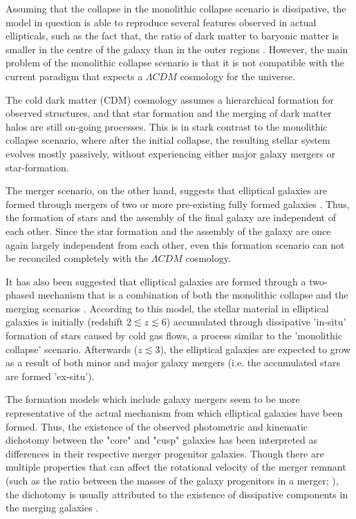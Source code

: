 \documentclass[english, twoside]{HYgradu}
\begin{document}
Assuming that the collapse in the monolithic collapse scenario is dissipative, the model in question is able to reproduce several features observed in actual ellipticals, such as the fact that, the ratio of dark matter to baryonic matter is smaller in the centre of the galaxy than in the outer regions \citep{GalaxyFormationAndEvo2010}. However, the main problem of the monolithic collapse scenario is that it is not compatible with the current paradigm that expects a $\Lambda CDM$ cosmology for the universe. 

The cold dark matter (CDM) cosmology assumes a hierarchical formation for observed structures, and that star formation and the merging of dark matter halos are still on-going processes. This is in stark contrast to the monolithic collapse scenario, where after the initial collapse, the resulting stellar system evolves mostly passively, without experiencing either major galaxy mergers or star-formation.

The merger scenario, on the other hand, suggests that elliptical galaxies are formed through mergers of two or more pre-existing fully formed galaxies \citep{GalaxyFormationAndEvo2010}. Thus, the formation of stars and the assembly of the final galaxy are independent of each other. Since the star formation and the assembly of the galaxy are once again largely independent from each other, even this formation scenario can not be reconciled completely with the $\Lambda CDM$ cosmology.

It has also been suggested that elliptical galaxies are formed through a two-phased mechanism that is a combination of both the monolithic collapse and the merging scenarios \citep[e.g.][]{Oser2010}. According to this model, the stellar material in elliptical galaxies is initially (redshift $2 \lesssim z \lesssim 6$) accumulated through dissipative 'in-situ' formation of stars caused by cold gas flows, a process similar to the 'monolithic collapse' scenario. Afterwards ($z \lesssim 3$), the elliptical galaxies are expected to grow as a result of both minor and major galaxy mergers (i.e. the accumulated stars are formed 'ex-situ'). 

The formation models which include galaxy mergers seem to be more representative of the actual mechanism from which elliptical galaxies have been formed. Thus, the existence of the observed photometric and kinematic dichotomy between the "core" and "cusp" galaxies has been interpreted as differences in their respective merger progenitor galaxies. Though there are multiple properties that can affect the rotational velocity of the merger remnant (such as the ratio between the masses of the galaxy progenitors in a merger; \citealt{Naab2003}), the dichotomy is usually attributed to the existence of dissipative components in the merging galaxies \citep{GalaxyFormationAndEvo2010}.
\end{document}

